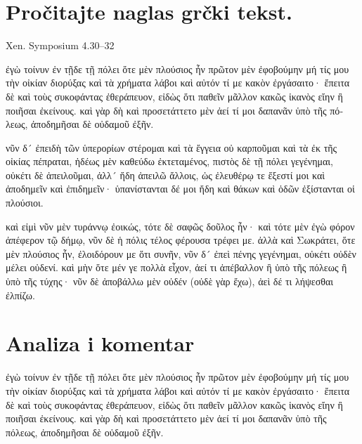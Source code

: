 
\section*{Pročitajte naglas grčki tekst.}

Xen. Symposium 4.30–32


\medskip


{\large

\begin{greek}

\noindent ἐγὼ τοίνυν ἐν τῇδε τῇ πόλει ὅτε μὲν πλούσιος ἦν πρῶτον μὲν ἐφοβούμην μή τίς μου τὴν οἰκίαν διορύξας καὶ τὰ χρήματα λάβοι καὶ αὐτόν τί με κακὸν ἐργάσαιτο· ἔπειτα δὲ καὶ τοὺς συκοφάντας ἐθεράπευον, εἰδὼς ὅτι παθεῖν μᾶλλον κακῶς ἱκανὸς εἴην ἢ ποιῆσαι ἐκείνους. καὶ γὰρ δὴ καὶ προσετάττετο μὲν ἀεί τί μοι δαπανᾶν ὑπὸ τῆς πόλεως, ἀποδημῆσαι δὲ οὐδαμοῦ ἐξῆν.

\noindent νῦν δ´ ἐπειδὴ τῶν ὑπερορίων στέρομαι καὶ τὰ ἔγγεια οὐ καρποῦμαι καὶ τὰ ἐκ τῆς οἰκίας πέπραται, ἡδέως μὲν καθεύδω ἐκτεταμένος, πιστὸς δὲ τῇ πόλει γεγένημαι, οὐκέτι δὲ ἀπειλοῦμαι, ἀλλ´ ἤδη ἀπειλῶ ἄλλοις, ὡς ἐλευθέρῳ τε ἔξεστί μοι καὶ ἀποδημεῖν καὶ ἐπιδημεῖν· ὑπανίστανται δέ μοι ἤδη καὶ θάκων καὶ ὁδῶν ἐξίστανται οἱ πλούσιοι.

\noindent καὶ εἰμὶ νῦν μὲν τυράννῳ ἐοικώς, τότε δὲ σαφῶς δοῦλος ἦν· καὶ τότε μὲν ἐγὼ φόρον ἀπέφερον τῷ δήμῳ, νῦν δὲ ἡ πόλις τέλος φέρουσα τρέφει με. ἀλλὰ καὶ Σωκράτει, ὅτε μὲν πλούσιος ἦν, ἐλοιδόρουν με ὅτι συνῆν, νῦν δ´ ἐπεὶ πένης γεγένημαι, οὐκέτι οὐδὲν μέλει οὐδενί. καὶ μὴν ὅτε μέν γε πολλὰ εἶχον, ἀεί τι ἀπέβαλλον ἢ ὑπὸ τῆς πόλεως ἢ ὑπὸ τῆς τύχης· νῦν δὲ ἀποβάλλω μὲν οὐδέν (οὐδὲ γὰρ ἔχω), ἀεὶ δέ τι λήψεσθαι ἐλπίζω. 

\end{greek}

}


\section*{Analiza i komentar}


{\large
\begin{greek}
\noindent ἐγὼ τοίνυν 
ἐν τῇδε τῇ πόλει 
ὅτε μὲν πλούσιος ἦν 
πρῶτον μὲν ἐφοβούμην 
μή τίς μου τὴν οἰκίαν διορύξας 
καὶ τὰ χρήματα λάβοι 
καὶ αὐτόν τί με κακὸν ἐργάσαιτο· 
ἔπειτα δὲ  
καὶ τοὺς συκοφάντας ἐθεράπευον, 
εἰδὼς ὅτι παθεῖν μᾶλλον κακῶς 
ἱκανὸς εἴην 
ἢ ποιῆσαι ἐκείνους. 
καὶ γὰρ δὴ καὶ 
προσετάττετο μὲν ἀεί 
τί μοι δαπανᾶν 
ὑπὸ τῆς πόλεως, 
ἀποδημῆσαι δὲ οὐδαμοῦ 
ἐξῆν.

\end{greek}
}

